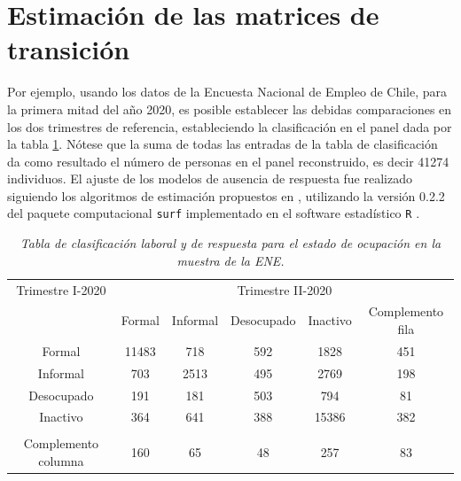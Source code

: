 \documentclass[
  10pt,
  spanish,
]{book}
\begin{document}
\hypertarget{estimaciuxf3n-de-las-matrices-de-transiciuxf3n}{%
\section{Estimación de las matrices de transición}\label{estimaciuxf3n-de-las-matrices-de-transiciuxf3n}}

Por ejemplo, usando los datos de la Encuesta Nacional de Empleo de Chile, para la primera mitad del año 2020, es posible establecer las debidas comparaciones en los dos trimestres de referencia, estableciendo la clasificación en el panel dada por la tabla \ref{t2}. Nótese que la suma de todas las entradas de la tabla de clasificación da como resultado el número de personas en el panel reconstruido, es decir 41274 individuos. El ajuste de los modelos de ausencia de respuesta fue realizado siguiendo los algoritmos de estimación propuestos en \citet{Gutierrez_2014}, utilizando la versión 0.2.2 del paquete computacional \texttt{surf} implementado en el software estadístico \texttt{R} \citep{Jacob_2020}.

\begin{table}[!h]
\centering
{\footnotesize
\begin{tabular}{cccccc}
Trimestre I-2020 &\multicolumn{5}{c}{Trimestre II-2020}\\\cline{2-6}
                    &Formal    &Informal     &Desocupado   &Inactivo   &Complemento fila\\\hline
Formal              &11483       &718             &592        &1828                  &451\\
Informal            &703         &2513            &495        &2769                   &198\\
Desocupado            &191        &181             &503       &794                  &81\\
Inactivo          &364          &641              &388         &15386                &382\\ \\
Complemento columna &160        &65             &48        &257                 &83 \\\hline
\end{tabular}
}
\caption{\emph{Tabla de clasificación laboral y de respuesta para el estado de ocupación en la muestra de la ENE.}}
\label{t2}
\end{table}
\end{document}
